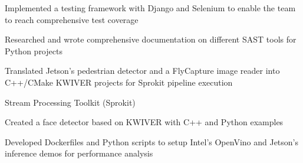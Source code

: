 \documentclass[]{resume-formatting}
\begin{document}
\begin{minipage}[t]{0.7\textwidth}
\begin{tightemize}
\item Implemented a testing framework with Django and Selenium to enable the team to reach comprehensive test coverage
\item Researched and wrote comprehensive documentation on different SAST tools for Python projects
\end{tightemize}
\sectionsep

\begin{tightemize}
\item Translated Jetson's pedestrian detector and a FlyCapture image reader into C++/CMake KWIVER projects for Sprokit pipeline execution
    \vspace{3pt}
    \begin{tightemize}
    \item Stream Processing Toolkit (Sprokit)
    \end{tightemize}
    \vspace{5pt}
\item Created a face detector based on KWIVER with C++ and Python examples
\item Developed Dockerfiles and Python scripts to setup Intel's OpenVino and Jetson's inference demos for performance analysis

\end{tightemize}
\sectionsep



\end{minipage}
\end{document}
